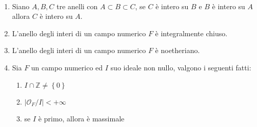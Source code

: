 \begin{proposizione}\
	\begin{enumerate}
		\item Siano $A, B, C$ tre anelli con $A\subset B\subset C$, se $C$ è intero su $B$ e $B$ è intero su $A$ allora $C$ è intero su $A$.
		\item L'anello degli interi di un campo numerico $F$ è integralmente chiuso.
		\item L'anello degli interi di un campo numerico $F$ è noetheriano.
		\item Sia $F$ un campo numerico ed $I$ suo ideale non nullo, valgono i seguenti fatti:
		\begin{enumerate}
			\item $I\cap\mathbb{Z}\neq\left\{0\right\}$
			\item $\left|\mathcal{O}_F/I\right|<+\infty$
			\item se $I$ è primo, allora è massimale
		\end{enumerate}
	\end{enumerate}
\end{proposizione}
